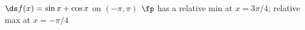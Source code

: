 {$\ds f(x) = \sin x + \cos x$ on $(-\pi,\pi)$
}
{$\fp$ has a relative min at $x=3\pi/4$;
relative max at $x=-\pi/4$
}
